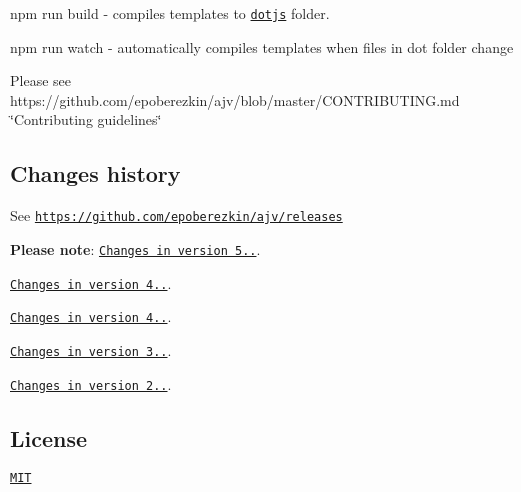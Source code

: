 {\ttfamily npm run build} -\/ compiles templates to \href{https://github.com/epoberezkin/ajv/tree/master/lib/dotjs}{\tt dotjs} folder.

{\ttfamily npm run watch} -\/ automatically compiles templates when files in dot folder change

Please see https\+://github.com/epoberezkin/ajv/blob/master/\+C\+O\+N\+T\+R\+I\+B\+U\+T\+I\+N\+G.\+md \char`\"{}\+Contributing guidelines\char`\"{}

\subsection*{Changes history}

See \href{https://github.com/epoberezkin/ajv/releases}{\tt https\+://github.\+com/epoberezkin/ajv/releases}

{\bfseries Please note}\+: \href{https://github.com/epoberezkin/ajv/releases/tag/5.0.0}{\tt Changes in version 5..}.

\href{https://github.com/epoberezkin/ajv/releases/tag/4.6.0}{\tt Changes in version 4..}.

\href{https://github.com/epoberezkin/ajv/releases/tag/4.0.0}{\tt Changes in version 4..}.

\href{https://github.com/epoberezkin/ajv/releases/tag/3.0.0}{\tt Changes in version 3..}.

\href{https://github.com/epoberezkin/ajv/releases/tag/2.0.0}{\tt Changes in version 2..}.

\subsection*{License}

\href{https://github.com/epoberezkin/ajv/blob/master/LICENSE}{\tt M\+IT} 